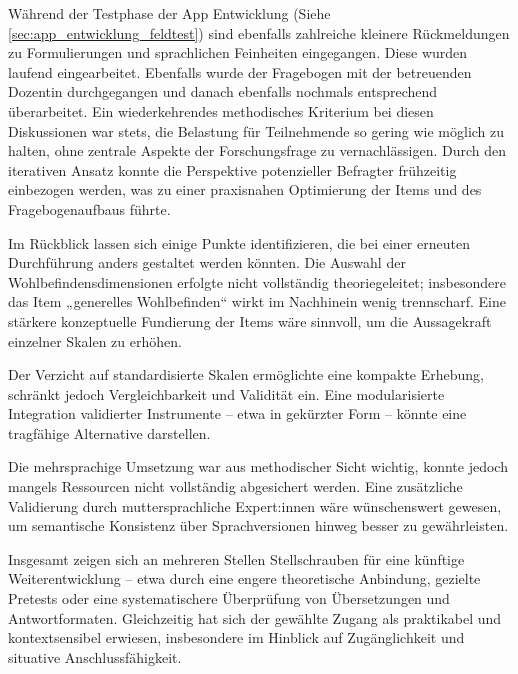 Während der Testphase der App Entwicklung (Siehe \cref{sec:app_entwicklung_feldtest}) sind ebenfalls zahlreiche kleinere Rückmeldungen zu Formulierungen und sprachlichen Feinheiten eingegangen. Diese wurden laufend eingearbeitet. Ebenfalls wurde der Fragebogen mit der betreuenden Dozentin durchgegangen und danach ebenfalls nochmals entsprechend überarbeitet.
Ein wiederkehrendes methodisches Kriterium bei diesen Diskussionen war stets, die Belastung für Teilnehmende so gering wie möglich zu halten, ohne zentrale Aspekte der Forschungsfrage zu vernachlässigen. Durch den iterativen Ansatz konnte die Perspektive potenzieller Befragter frühzeitig einbezogen werden, was zu einer praxisnahen Optimierung der Items und des Fragebogenaufbaus führte.

Im Rückblick lassen sich einige Punkte identifizieren, die bei einer erneuten Durchführung anders gestaltet werden könnten. Die Auswahl der Wohlbefindensdimensionen erfolgte nicht vollständig theoriegeleitet; insbesondere das Item „generelles Wohlbefinden“ wirkt im Nachhinein wenig trennscharf. Eine stärkere konzeptuelle Fundierung der Items wäre sinnvoll, um die Aussagekraft einzelner Skalen zu erhöhen.

Der Verzicht auf standardisierte Skalen ermöglichte eine kompakte Erhebung, schränkt jedoch Vergleichbarkeit und Validität ein. Eine modularisierte Integration validierter Instrumente -- etwa in gekürzter Form -- könnte eine tragfähige Alternative darstellen.

Die mehrsprachige Umsetzung war aus methodischer Sicht wichtig, konnte jedoch mangels Ressourcen nicht vollständig abgesichert werden. Eine zusätzliche Validierung durch muttersprachliche Expert:innen wäre wünschenswert gewesen, um semantische Konsistenz über Sprachversionen hinweg besser zu gewährleisten.

Insgesamt zeigen sich an mehreren Stellen Stellschrauben für eine künftige Weiterentwicklung -- etwa durch eine engere theoretische Anbindung, gezielte Pretests oder eine systematischere Überprüfung von Übersetzungen und Antwortformaten. Gleichzeitig hat sich der gewählte Zugang als praktikabel und kontextsensibel erwiesen, insbesondere im Hinblick auf Zugänglichkeit und situative Anschlussfähigkeit.





